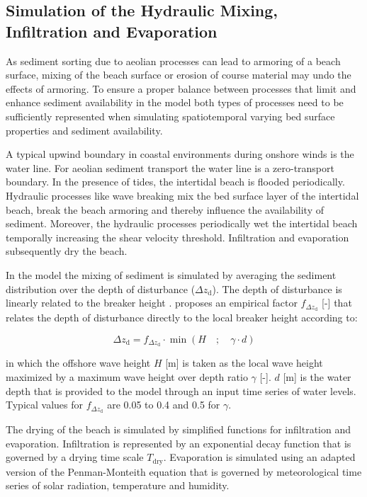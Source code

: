 \subsection{Simulation of the Hydraulic Mixing, Infiltration and
  Evaporation} \label{sec:marine_processes}

As sediment sorting due to aeolian processes can lead to armoring of a
beach surface, mixing of the beach surface or erosion of course
material may undo the effects of armoring. To ensure a proper balance
between processes that limit and enhance sediment availability in the
model both types of processes need to be sufficiently represented when
simulating spatiotemporal varying bed surface properties and sediment
availability.

A typical upwind boundary in coastal environments during onshore winds
is the water line. For aeolian sediment transport the water line is a
zero-transport boundary. In the presence of tides, the intertidal
beach is flooded periodically. Hydraulic processes like wave breaking
mix the bed surface layer of the intertidal beach, break the beach
armoring and thereby influence the availability of sediment. Moreover,
the hydraulic processes periodically wet the intertidal beach
temporally increasing the shear velocity threshold. Infiltration and
evaporation subsequently dry the beach.

In the model the mixing of sediment is simulated by averaging the
sediment distribution over the depth of disturbance
($\Delta z_{\mathrm{d}}$). The depth of disturbance is linearly
related to the breaker height \citep[e.g.][]{King1951, Williams1971,
  Masselink2007}. \citet{Masselink2007} proposes an empirical factor
$f_{\Delta z_{\mathrm{d}}}$ [-] that relates the depth of disturbance
directly to the local breaker height according to:

\begin{equation}
  \label{eq:dod}
  \Delta z_{\mathrm{d}} = f_{\Delta z_{\mathrm{d}}} \cdot \min \left ( H \quad ; \quad \gamma \cdot d \right )
\end{equation}

\noindent in which the offshore wave height $H$ [m] is taken as the
local wave height maximized by a maximum wave height over depth ratio
$\gamma$ [-]. $d$ [m] is the water depth that is provided to the model
through an input time series of water levels. Typical values for
$f_{\Delta z_{\mathrm{d}}}$ are 0.05 to 0.4 and 0.5 for $\gamma$.

The drying of the beach is simulated by simplified functions for
infiltration and evaporation. Infiltration is represented by an
exponential decay function that is governed by a drying time scale
$T_{\mathrm{dry}}$. Evaporation is simulated using an adapted version
of the Penman-Monteith equation \citep{Shuttleworth1993} that is
governed by meteorological time series of solar radiation, temperature
and humidity.

